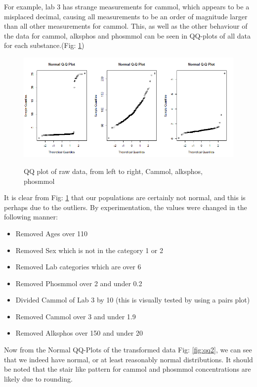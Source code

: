\documentclass{article}
\begin{document}
           For example, lab 3 has strange measurements for cammol, which appears to be a misplaced decimal, causing all measurements to be an order of magnitude larger than all other measurements for cammol. This, as well as the other behaviour of the data for cammol, alksphos and phosmmol can be seen in QQ-plots of all data for each substance.(Fig: \ref{fig:qq1}) 
      \begin{figure}
		\centering
		{\includegraphics[scale=0.3]{../results/dat1_qq.png}}
		\caption{QQ plot of raw data, from left to right, Cammol, alksphos, phosmmol}
		\label{fig:qq1}
	\end{figure}

It is clear from Fig: \ref{fig:qq1} that our populations are certainly not normal, and this is perhaps due to the outliers. By experimentation, the values were changed in the following manner:
      \begin{itemize}
        \item Removed Ages over 110
        \item Removed Sex which is not in the category 1 or 2
        \item Removed Lab categories which are over 6
        \item Removed Phosmmol over 2 and under 0.2
        \item Divided Cammol of Lab 3 by 10 (this is visually tested by using a pairs plot)
        \item Removed Cammol over 3 and under 1.9
        \item Removed Alksphos over 150 and under 20
      \end{itemize}

Now from the Normal QQ-Plots of the transformed data Fig: \ref{fig:qq2}, we can see that we indeed have normal, or at least reasonably normal distributions. It should be noted that the stair like pattern for cammol and phosmmol concentrations are likely due to rounding.
\end{document}
